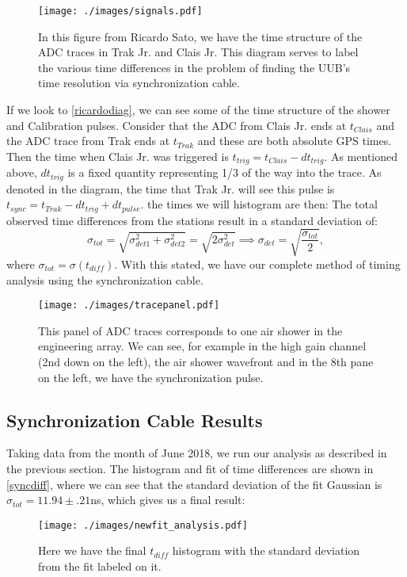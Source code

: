 \begin{figure}[H]
\centering
\texttt{[image: ./images/signals.pdf]}
\caption[Synchronization Cable Timing Diagram]{In this figure from Ricardo Sato, we have the time structure of the ADC traces in Trak Jr. and Clais Jr. This diagram serves to label the various time differences in the problem of finding the UUB's time resolution via synchronization cable.}
\label{ricardodiag}
\end{figure}
If we look to \autoref{ricardodiag}, we can see some of the time structure of the shower and Calibration pulses. Consider that the ADC from Clais Jr. ends at $t_{Clais}$ and the ADC trace from Trak ends at $t_{Trak}$ and these are both absolute GPS times. Then the time when Clais Jr. was triggered is $t_{trig}=t_{Clais}-dt_{trig}$. As mentioned above, $dt_{trig}$ is a fixed quantity representing 1/3 of the way into the trace. As denoted in the diagram, the time that Trak Jr. will see this pulse is $t_{sync}=t_{Trak}-dt_{trig}+dt_{pulse}$. the times we will histogram are then:
The total observed time differences from the stations result in a standard deviation of:
$$\sigma_{tot}=\sqrt{\sigma_{det1}^2+\sigma_{det2}^2}=\sqrt{2\sigma_{det}^2}\implies\sigma_{det}=\sqrt{\frac{\sigma_{tot}}{2}},$$
where $\sigma_{tot}=\sigma(t_{diff})$. With this stated, we have our complete method of timing analysis using the synchronization cable.
\begin{figure}[p]
\centering
\texttt{[image: ./images/tracepanel.pdf]}
\caption[ADC Trace Panel]{This panel of ADC traces corresponds to one air shower in the engineering array. We can see, for example in the high gain channel (2nd down on the left), the air shower wavefront and in the 8th pane on the left, we have the synchronization pulse.}
\label{tracepanel}
\end{figure}
\newpage
\subsection{Synchronization Cable Results}
Taking data from the month of June 2018, we run our analysis as described in the previous section. The histogram and fit of time differences are shown in \autoref{syncdiff}, where we can see that the standard deviation of the fit Gaussian is $\sigma_{tot}=11.94\pm.21$ns, which gives us a final result:
\begin{figure}[H]
\centering
\texttt{[image: ./images/newfit\_analysis.pdf]}
\caption[Sync-Cable Histogram of $t_{diff}$]{Here we have the final $t_{diff}$ histogram with the standard deviation from the fit labeled on it.}
\label{syncdiff}
\end{figure}
